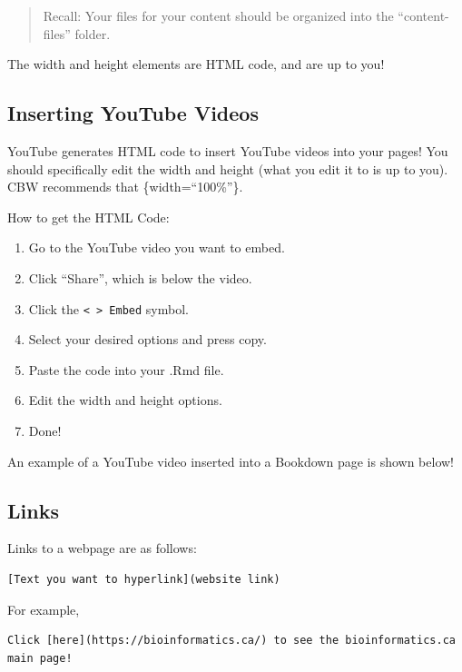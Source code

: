 \documentclass[
]{book}
\providecommand{\tightlist}{%
  \setlength{\itemsep}{0pt}\setlength{\parskip}{0pt}}
\theoremstyle{definition}
\theoremstyle{definition}
\theoremstyle{definition}
\theoremstyle{definition}
\theoremstyle{remark}
\begin{document}
\begin{quote}
Recall: Your files for your content should be organized into the ``content-files'' folder.
\end{quote}

The width and height elements are HTML code, and are up to you!

\subsection*{Inserting YouTube Videos}\label{inserting-youtube-videos}

YouTube generates HTML code to insert YouTube videos into your pages! You should specifically edit the width and height (what you edit it to is up to you). CBW recommends that \{width=``100\%''\}.

How to get the HTML Code:

\begin{enumerate}
\def\labelenumi{\arabic{enumi}.}
\tightlist
\item
  Go to the YouTube video you want to embed.
\item
  Click ``Share'', which is below the video.
\item
  Click the \texttt{\textless{}\ \textgreater{}\ Embed} symbol.
\item
  Select your desired options and press copy.
\item
  Paste the code into your .Rmd file.
\item
  Edit the width and height options.
\item
  Done!
\end{enumerate}

An example of a YouTube video inserted into a Bookdown page is shown below!

\subsection*{Links}\label{links}

Links to a webpage are as follows:

\begin{verbatim}
[Text you want to hyperlink](website link)
\end{verbatim}

For example,

\begin{verbatim}
Click [here](https://bioinformatics.ca/) to see the bioinformatics.ca main page!
\end{verbatim}
\end{document}

